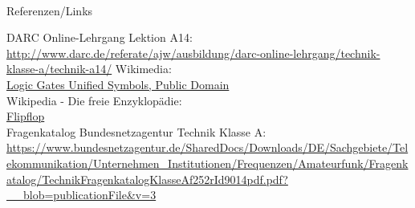 \renewcommand{\refname}{Referenzen}

\hypertarget{refs}{}
\textcolor{white}{} \\ %
\Large Referenzen/Links
\footnotesize

\begin{thebibliography}{}
    DARC Online-Lehrgang Lektion A14:\\
    \url{http://www.darc.de/referate/ajw/ausbildung/darc-online-lehrgang/technik-klasse-a/technik-a14/}
   	Wikimedia:\\
    \href{https://commons.wikimedia.org/wiki/Logic_gates_unified_symbols}{Logic Gates Unified Symbols, Public Domain}\\
      Wikipedia - Die freie Enzyklopädie:\\
    \href{https://de.wikipedia.org/wiki/Flipflop}{Flipflop}\\
     Fragenkatalog Bundesnetzagentur Technik Klasse A:\\
    \url{https://www.bundesnetzagentur.de/SharedDocs/Downloads/DE/Sachgebiete/Telekommunikation/Unternehmen_Institutionen/Frequenzen/Amateurfunk/Fragenkatalog/TechnikFragenkatalogKlasseAf252rId9014pdf.pdf?__blob=publicationFile&v=3}
\end{thebibliography}


